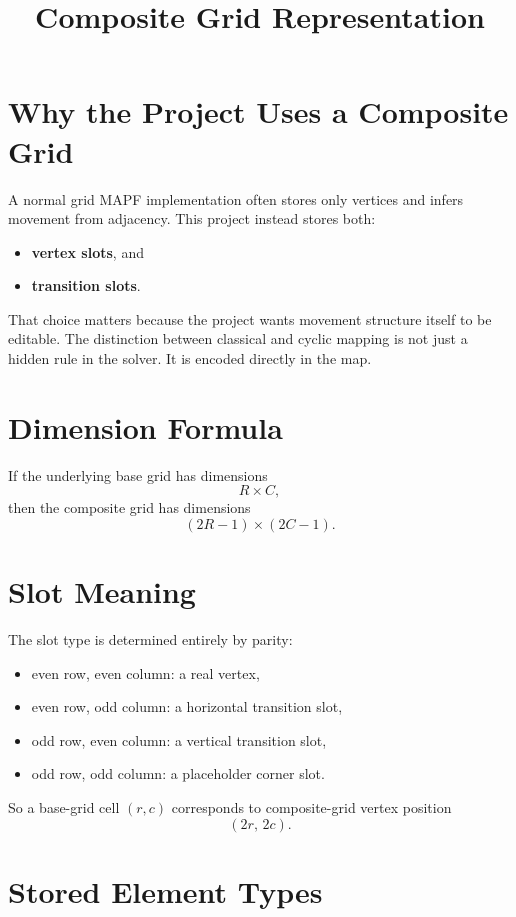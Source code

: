 \documentclass[11pt]{article}
\title{Composite Grid Representation}
\author{}
\date{}
\begin{document}
\maketitle

\section{Why the Project Uses a Composite Grid}

A normal grid MAPF implementation often stores only vertices and infers movement from adjacency. This project instead stores both:
\begin{itemize}[leftmargin=2em]
    \item \textbf{vertex slots}, and
    \item \textbf{transition slots}.
\end{itemize}

That choice matters because the project wants movement structure itself to be editable. The distinction between classical and cyclic mapping is not just a hidden rule in the solver. It is encoded directly in the map.

\section{Dimension Formula}

If the underlying base grid has dimensions
\[
R \times C,
\]
then the composite grid has dimensions
\[
(2R-1)\times(2C-1).
\]

\section{Slot Meaning}

The slot type is determined entirely by parity:
\begin{itemize}[leftmargin=2em]
    \item even row, even column: a real vertex,
    \item even row, odd column: a horizontal transition slot,
    \item odd row, even column: a vertical transition slot,
    \item odd row, odd column: a placeholder corner slot.
\end{itemize}

So a base-grid cell \((r,c)\) corresponds to composite-grid vertex position
\[
(2r,\,2c).
\]

\section{Stored Element Types}
\end{document}

